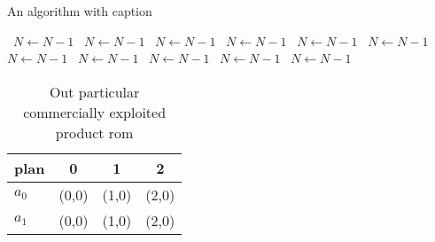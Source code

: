 \documentclass[a4paper]{article}
\begin{document}
\begin{algorithm}
\caption{An algorithm with caption}
\begin{algorithmic}
\    \State $N \gets N - 1$
\    \State $N \gets N - 1$
\    \State $N \gets N - 1$
\    \State $N \gets N - 1$
\    \State $N \gets N - 1$
\    \State $N \gets N - 1$
\    \State $N \gets N - 1$
\    \State $N \gets N - 1$
\    \State $N \gets N - 1$
\    \State $N \gets N - 1$
\    \State $N \gets N - 1$
\EndWhile
\end{algorithmic}
\end{algorithm}

\begin{table}
\begin{adjustbox}{width=0.6\columnwidth}
\begin{tabular}{|l|l|l|l|}
\hline
\textbf{plan} & \multicolumn{1}{c|}{\textbf{0}} & \multicolumn{1}{c|}{\textbf{1}} & \multicolumn{1}{c|}{\textbf{2}} \\ \hline
\textbf{$a_0$}  & (0,0) & (1,0) & (2,0) \\ \hline
\textbf{$a_1$}  & (0,0) & (1,0) & (2,0) \\ \hline
\end{tabular}
\end{adjustbox}
\caption{Out particular commercially exploited product rom
}
\end{table}
\end{document}
